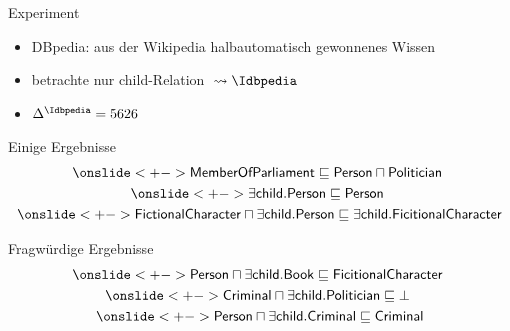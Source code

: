 \documentclass[ngerman]{beamer}
\begin{document}
\begin{frame}

  \onslide<+->
  
  \begin{block}{Experiment}
    \begin{itemize}
    \item<+-> DBpedia: aus der Wikipedia halbautomatisch gewonnenes Wissen
    \item<+-> betrachte nur \textsf{child}-Relation ${} \leadsto \Idbpedia$
    \item<+-> $\Delta^{\Idbpedia} = 5626$
    \end{itemize}
  \end{block}

  \onslide<+->

  \begin{block}{Einige Ergebnisse}
    \vspace*{-3ex}
    \begin{gather*}
      \onslide<+->{\sf MemberOfParliament \sqsubseteq Person \sqcap Politician}~\\
      \onslide<+->{\sf \exists child. Person \sqsubseteq Person}~\\
      \onslide<+->{\sf FictionalCharacter \sqcap \exists child. Person \sqsubseteq \exists
        child. FicitionalCharacter}
    \end{gather*}
  \end{block}

  \onslide<+->

  \begin{block}{Fragwürdige Ergebnisse}
    \vspace*{-3ex}
    \begin{gather*}
      \onslide<+->{\sf Person \sqcap \exists child. Book \sqsubseteq
        FicitionalCharacter}~\\
      \onslide<+->{\sf Criminal \sqcap \exists child. Politician \sqsubseteq \bot}~\\
      \onslide<+->{\sf Person \sqcap \exists child. Criminal \sqsubseteq Criminal}
    \end{gather*}
  \end{block}

\end{frame}
\end{document}
